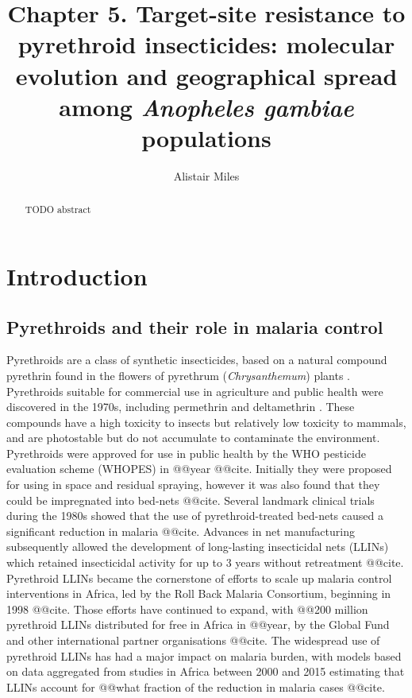 \documentclass[a4paper,11pt,abstracton,hidelinks]{scrartcl}
\title{Chapter 5. Target-site resistance to pyrethroid insecticides: molecular evolution and geographical spread among \textit{Anopheles gambiae} populations}
\author[1,2]{\small Alistair Miles}
\affil[1]{\footnotesize Big Data Institute, University of Oxford, Li Ka Shing Centre for Health Information and Discovery, Old Road Campus, Oxford OX3 7LF}
\affil[2]{\footnotesize Wellcome Sanger Institute, Hinxton, Cambridge CB10 1SA}
\begin{document}
\maketitle


\begin{abstract}


TODO abstract


\end{abstract}


\section*{Introduction}


\subsection*{Pyrethroids and their role in malaria control}


%
Pyrethroids are a class of synthetic insecticides, based on a natural compound pyrethrin found in the flowers of pyrethrum (\textit{Chrysanthemum}) plants \autocite{Elliott1989}.
%
Pyrethroids suitable for commercial use in agriculture and public health were discovered in the 1970s, including permethrin \autocite{Elliott1973} and deltamethrin \autocite{Elliott1974}.
%
These compounds have a high toxicity to insects but relatively low toxicity to mammals, and are photostable but do not accumulate to contaminate the environment.
%
Pyrethroids were approved for use in public health by the WHO pesticide evaluation scheme (WHOPES) in @@year @@cite.
%
Initially they were proposed for using in space and residual spraying, however it was also found that they could be impregnated into bed-nets @@cite.
%
Several landmark clinical trials during the 1980s showed that the use of pyrethroid-treated bed-nets caused a significant reduction in malaria @@cite.
%
Advances in net manufacturing subsequently allowed the development of long-lasting insecticidal nets (LLINs) which retained insecticidal activity for up to 3 years without retreatment @@cite.
%
Pyrethroid LLINs became the cornerstone of efforts to scale up malaria control interventions in Africa, led by the Roll Back Malaria Consortium, beginning in 1998 @@cite.
%
Those efforts have continued to expand, with @@200 million pyrethroid LLINs distributed for free in Africa in @@year, by the Global Fund and other international partner organisations @@cite.
%
The widespread use of pyrethroid LLINs has had a major impact on malaria burden, with models based on data aggregated from studies in Africa between 2000 and 2015 estimating that LLINs account for @@what fraction of the reduction in malaria cases @@cite.
\end{document}
